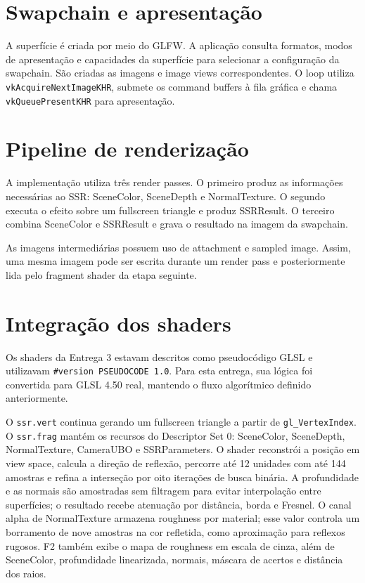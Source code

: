 \documentclass[12pt,a4paper]{article}
\begin{document}
\section{Swapchain e apresentação}
A superfície é criada por meio do GLFW. A aplicação consulta formatos, modos de apresentação e capacidades da superfície para selecionar a configuração da swapchain. São criadas as imagens e image views correspondentes. O loop utiliza \texttt{vkAcquireNextImageKHR}, submete os command buffers à fila gráfica e chama \texttt{vkQueuePresentKHR} para apresentação.

\section{Pipeline de renderização}
A implementação utiliza três render passes. O primeiro produz as informações necessárias ao SSR: SceneColor, SceneDepth e NormalTexture. O segundo executa o efeito sobre um fullscreen triangle e produz SSRResult. O terceiro combina SceneColor e SSRResult e grava o resultado na imagem da swapchain.

As imagens intermediárias possuem uso de attachment e sampled image. Assim, uma mesma imagem pode ser escrita durante um render pass e posteriormente lida pelo fragment shader da etapa seguinte.

\section{Integração dos shaders}
Os shaders da Entrega 3 estavam descritos como pseudocódigo GLSL e utilizavam \texttt{\#version PSEUDOCODE 1.0}. Para esta entrega, sua lógica foi convertida para GLSL 4.50 real, mantendo o fluxo algorítmico definido anteriormente.

O \texttt{ssr.vert} continua gerando um fullscreen triangle a partir de \texttt{gl\_VertexIndex}. O \texttt{ssr.frag} mantém os recursos do Descriptor Set 0: SceneColor, SceneDepth, NormalTexture, CameraUBO e SSRParameters. O shader reconstrói a posição em view space, calcula a direção de reflexão, percorre até 12 unidades com até 144 amostras e refina a interseção por oito iterações de busca binária. A profundidade e as normais são amostradas sem filtragem para evitar interpolação entre superfícies; o resultado recebe atenuação por distância, borda e Fresnel. O canal alpha de NormalTexture armazena roughness por material; esse valor controla um borramento de nove amostras na cor refletida, como aproximação para reflexos rugosos. F2 também exibe o mapa de roughness em escala de cinza, além de SceneColor, profundidade linearizada, normais, máscara de acertos e distância dos raios.
\end{document}
